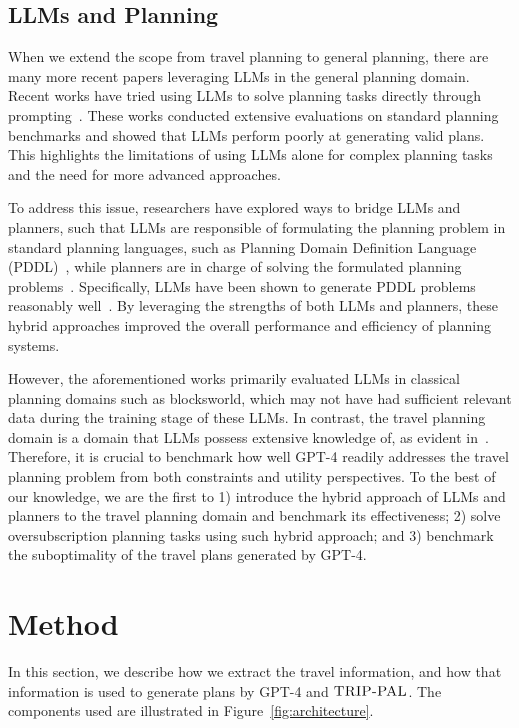 \documentclass[letterpaper]{article}
\newcommand{\gpt}{{\sc GPT-4}\xspace}
\newcommand{\approach}{\ensuremath{\textsc{TRIP-PAL}}\xspace}
\begin{document}
\subsection{LLMs and Planning}
When we extend the scope from travel planning to general planning, there are many more recent papers leveraging LLMs in the general planning domain. Recent works have tried using LLMs to solve planning tasks directly through prompting~\cite{valmeekam2022large,silver2024generalized}. These works conducted extensive evaluations on standard planning benchmarks and showed that LLMs perform poorly at generating valid plans. This highlights the limitations of using LLMs alone for complex planning tasks and the need for more advanced approaches.

To address this issue, researchers have explored ways to bridge LLMs and planners, such that LLMs are responsible of formulating the planning problem in standard planning languages, such as Planning Domain Definition Language (PDDL)~\cite{PDDL21-JAIR03}, while planners are in charge of solving the formulated planning problems~\cite{guan2023leveraging,liu2023llm+}. Specifically, LLMs have been shown to generate PDDL problems reasonably well~\cite{oswald2024large,pallagani2024prospects}. By leveraging the strengths of both LLMs and planners, these hybrid approaches improved the overall performance and efficiency of planning systems.

However, the aforementioned works primarily evaluated LLMs in classical planning domains such as blocksworld, which may not have had sufficient relevant data during the training stage of these LLMs. In contrast, the travel planning domain is a domain that LLMs possess extensive knowledge of, as evident in~\cite{GPT_travel_plan_wong2023autonomous}. Therefore, it is crucial to benchmark how well \gpt readily addresses the travel planning problem from both constraints and utility perspectives. To the best of our knowledge, we are the first to 1) introduce the hybrid approach of LLMs and planners to the travel planning domain and benchmark its effectiveness; 2) solve oversubscription planning tasks using such hybrid approach; and 3) benchmark the suboptimality of the travel plans generated by \gpt.
    

\section{Method}
In this section, we describe how we extract the travel information, and how that information is used to generate plans by \gpt and \approach. The components used are illustrated in Figure~\ref{fig:architecture}.
\end{document}
